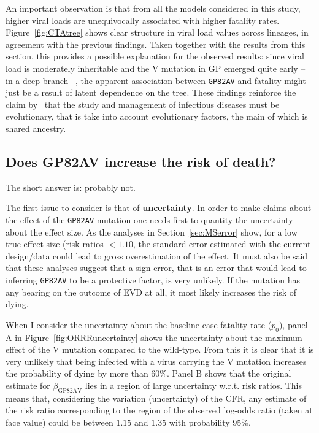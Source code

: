An important observation is that from all the models considered in this study, higher viral loads are unequivocally associated with higher fatality rates.
Figure~\ref{fig:CTAtree} shows clear structure in viral load values across lineages, in agreement with the previous findings.
Taken together with the results from this section, this provides a possible explanation for the observed results: since viral load is moderately inheritable and the V mutation in GP emerged quite early -- in a deep branch --, the apparent association between \verb|GP82AV| and fatality might just be a result of latent dependence on the tree.
These findings reinforce the claim by~\cite{Russell2017} that the study and management of infectious diseases must be evolutionary, that is take into account evolutionary factors, the main of which is shared ancestry.

\subsection{Does GP82AV increase the risk of death?}

The short answer is: probably not.

The first issue to consider is that of \textbf{uncertainty}. 
In order to make claims about the effect of the \verb|GP82AV| mutation one needs first to quantity the uncertainty about the effect size.
As the analyses in Section~\ref{sec:MSerror} show, for a low true effect size (risk ratios $<1.10$, the standard error estimated with the current design/data could lead to gross overestimation of the effect. 
It must also be said that these analyses suggest that a sign error, that is an error that would lead to inferring \verb|GP82AV| to be a protective factor, is very unlikely.
If the mutation has any bearing on the outcome of EVD at all, it most likely increases the risk of dying.

When I consider the uncertainty about the baseline case-fatality rate ($p_0$), panel A in Figure~\ref{fig:ORRRuncertainty} shows the uncertainty about the maximum effect of the V mutation compared to the wild-type.
From this it is clear that it is very unlikely that being infected with a virus carrying the V mutation increases the probability of dying by more than $60$\%.
Panel B shows that the original estimate for $\beta_{\text{GP82AV}}$ lies in a region of large uncertainty w.r.t. risk ratios.
This means that, considering the variation (uncertainty) of the CFR, any estimate of the risk ratio corresponding  to the region of the observed log-odds ratio (taken at face value) could be between $1.15$ and $1.35$ with probability 95\%.

